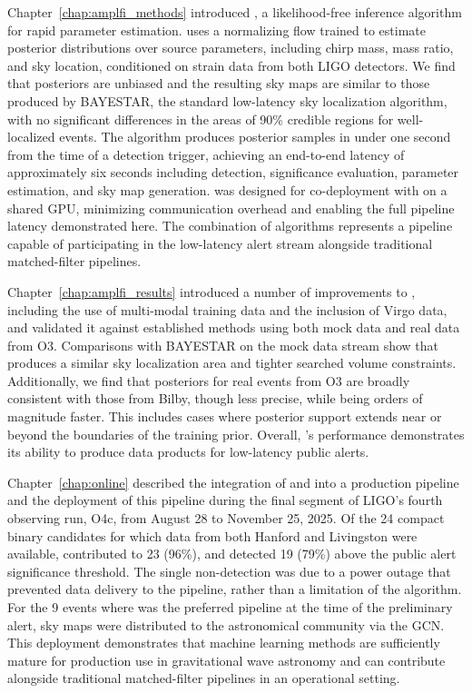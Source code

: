 Chapter~\ref{chap:amplfi_methods} introduced \amplfi, a likelihood-free inference algorithm for rapid parameter estimation.
\amplfi uses a normalizing flow trained to estimate posterior distributions over source parameters, including chirp mass, mass ratio, and sky location, conditioned on strain data from both LIGO detectors.
We find that \amplfi posteriors are unbiased and the resulting sky maps are similar to those produced by BAYESTAR, the standard low-latency sky localization algorithm, with no significant differences in the areas of 90\% credible regions for well-localized events.
The algorithm produces posterior samples in under one second from the time of a detection trigger, achieving an end-to-end latency of approximately six seconds including detection, significance evaluation, parameter estimation, and sky map generation.
\amplfi was designed for co-deployment with \aframe on a shared GPU, minimizing communication overhead and enabling the full pipeline latency demonstrated here.
The combination of algorithms represents a pipeline capable of participating in the low-latency alert stream alongside traditional matched-filter pipelines. 

Chapter~\ref{chap:amplfi_results} introduced a number of improvements to \amplfi, including the use of multi-modal training data and the inclusion of Virgo data, and validated it against established methods using both mock data and real data from O3.
Comparisons with BAYESTAR on the mock data stream show that \amplfi produces a similar sky localization area and tighter searched volume constraints.
Additionally, we find that \amplfi posteriors for real events from O3 are broadly consistent with those from Bilby, though less precise, while being orders of magnitude faster.
This includes cases where posterior support extends near or beyond the boundaries of the training prior.
Overall, \amplfi's performance demonstrates its ability to produce data products for low-latency public alerts.

Chapter~\ref{chap:online} described the integration of \aframe and \amplfi into a production pipeline and the deployment of this pipeline during the final segment of LIGO's fourth observing run, O4c, from August 28 to November 25, 2025.
Of the 24 compact binary candidates for which data from both Hanford and Livingston were available, \aframe contributed to 23 (96\%), and detected 19 (79\%) above the public alert significance threshold.
The single non-detection was due to a power outage that prevented data delivery to the pipeline, rather than a limitation of the algorithm.
For the 9 events where \aframe was the preferred pipeline at the time of the preliminary alert, \amplfi sky maps were distributed to the astronomical community via the GCN.
This deployment demonstrates that machine learning methods are sufficiently mature for production use in gravitational wave astronomy and can contribute alongside traditional matched-filter pipelines in an operational setting.

